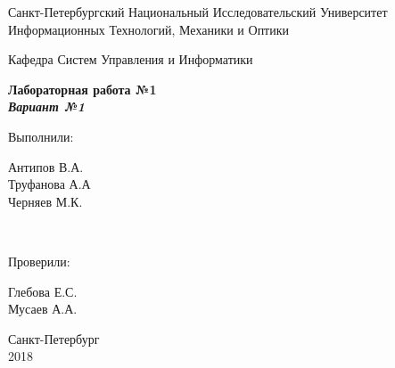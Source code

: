 \begin{titlepage}
  \begin{center}
    \vspace{2cm}
    Санкт-Петербургский Национальный Исследовательский Университет\\
    Информационных Технологий, Механики и Оптики

    \vspace{6cm}

    Кафедра Систем Управления и Информатики

    \vspace{3cm}
    \textbf{Лабораторная работа №1 \\ \textit{Вариант №1}}
  \end{center}
  \vspace{4cm}
  \hfill
  \parbox[top][3cm][t]{3cm}{Выполнили:}
  \parbox[top][3cm][t]{3cm}{
  Антипов В.А.\\
  Труфанова А.А\\
  Черняев М.К.}
  \\

  \hfill
  \parbox[right][3cm][t]{3cm}{Проверили:}
  \parbox[right][3cm][t]{3cm}{
  Глебова Е.С.\\
  Мусаев А.А.}

  \vfill
  \begin{center}
  Санкт-Петербург \\ 2018
  \end{center}
\end{titlepage}